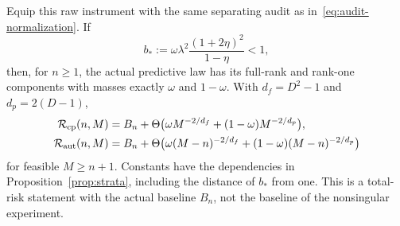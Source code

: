 \begin{theorem}\label{thm:singular}
Equip this raw instrument with the same separating audit as in~\eqref{eq:audit-normalization}. If
\begin{equation}\label{eq:singular-curvature}
 b_*:=\omega\lambda^2\frac{(1+2\eta)^2}{1-\eta}<1,
\end{equation}
then, for $n\ge1$, the actual predictive law has its full-rank and rank-one components with masses exactly $\omega$ and $1-\omega$. With $d_f=D^2-1$ and $d_p=2(D-1)$,
\begin{align}
 \mathcal R_{\rm cp}(n,M)&=B_n+\Theta\bigl(\omega M^{-2/d_f}+(1-\omega)M^{-2/d_p}\bigr),\label{eq:singular-cp}\\
 \mathcal R_{\rm aut}(n,M)&=B_n+\Theta\bigl(\omega(M-n)^{-2/d_f}+(1-\omega)(M-n)^{-2/d_p}\bigr)
 \label{eq:singular-aut}
\end{align}
for feasible $M\ge n+1$. Constants have the dependencies in Proposition~\ref{prop:strata}, including the distance of $b_*$ from one. This is a total-risk statement with the actual baseline $B_n$, not the baseline of the nonsingular experiment.
\end{theorem}
